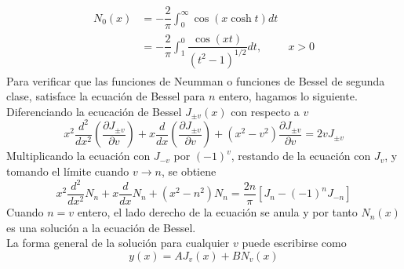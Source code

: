 \begin{eqnarray}
\begin{aligned}
N_{0}(x) &= - \dfrac{2}{\pi} \int_{0}^{\infty} \cos (x \cosh t ) dt \\
&= - \dfrac{2}{\pi} \int_{1}^{0} \dfrac{\cos (xt)}{(t^{2}-1)^{1/2}} dt, \hspace{1cm}  x>0
\end{aligned}
\label{eq:ecuacion_11_65a}
\end{eqnarray}
Para verificar que las funciones de Neumman o funciones de Bessel de segunda clase, satisface la ecuación de Bessel para $n$ entero, hagamos lo siguiente. Diferenciando la ecucación de Bessel $J_{\pm v}(x)$ con respecto a $v$
\begin{equation}
x^{2} \dfrac{d^{2}}{dx^{2}} \left( \dfrac{\partial J_{\pm v}}{\partial v} \right) + x \dfrac{d}{dx} \left( \dfrac{\partial J_{\pm v}}{\partial v} \right) + (x^{2} - v^{2}) \dfrac{\partial J_{\pm v}}{\partial v} = 2 v J_{\pm v}
\label{eq:ecuacion_11_66}
\end{equation}
Multiplicando la ecuación con $J_{-v}$ por $(-1)^{v}$, restando de la ecuación con $J_{v}$, y tomando el límite cuando $v \to n$, se obtiene
\begin{equation}
x^{2} \dfrac{d^{2}}{dx^{2}} N_{n} +  x \dfrac{d}{dx} N_{n} + (x^{2} - n^{2}) N_{n} = \dfrac{2n}{\pi}[ J_{n} - (-1)^{n} J_{-n}]
\label{eq:ecuacion_11_67}
\end{equation}
Cuando $n=v$ entero, el lado derecho de la ecuación se anula y por tanto $N_{n}(x)$ es una solución a la ecuación de Bessel.
\\
La forma general de la solución para cualquier $v$ puede escribirse como
\begin{equation}
y(x) = A J_{v}(x) + B N_{v}(x)
\end{equation}

